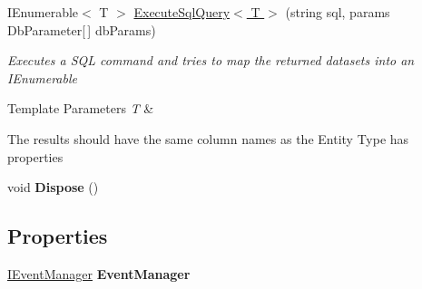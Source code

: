 \begin{DoxyCompactItemize}
I\-Enumerable$<$ T $>$ \hyperlink{class_highway_1_1_data_1_1_entity_framework_1_1_tests_1_1_unit_tests_1_1_e_f_failure_context_a91b52df7a933f1dc0f1abe342eb3f472}{Execute\-Sql\-Query$<$ T $>$} (string sql, params Db\-Parameter\mbox{[}$\,$\mbox{]} db\-Params)
\begin{DoxyCompactList}\small\item\em Executes a S\-Q\-L command and tries to map the returned datasets into an I\-Enumerable
\begin{DoxyTemplParams}{Template Parameters}
{\em T} & \\
\hline
\end{DoxyTemplParams}
The results should have the same column names as the Entity Type has properties \end{DoxyCompactList}\item 
\hypertarget{class_highway_1_1_data_1_1_entity_framework_1_1_tests_1_1_unit_tests_1_1_e_f_failure_context_a3389be3fef6aad8d1c1a16cfaa9073ba}{void {\bfseries Dispose} ()}\label{class_highway_1_1_data_1_1_entity_framework_1_1_tests_1_1_unit_tests_1_1_e_f_failure_context_a3389be3fef6aad8d1c1a16cfaa9073ba}

\end{DoxyCompactItemize}
\subsection*{Properties}
\begin{DoxyCompactItemize}
\item 
\hypertarget{class_highway_1_1_data_1_1_entity_framework_1_1_tests_1_1_unit_tests_1_1_e_f_failure_context_ae4c0516c6ac2f3768cab39b95cea46c2}{\hyperlink{interface_highway_1_1_data_1_1_interfaces_1_1_i_event_manager}{I\-Event\-Manager} {\bfseries Event\-Manager}}\label{class_highway_1_1_data_1_1_entity_framework_1_1_tests_1_1_unit_tests_1_1_e_f_failure_context_ae4c0516c6ac2f3768cab39b95cea46c2}

\end{DoxyCompactItemize}


